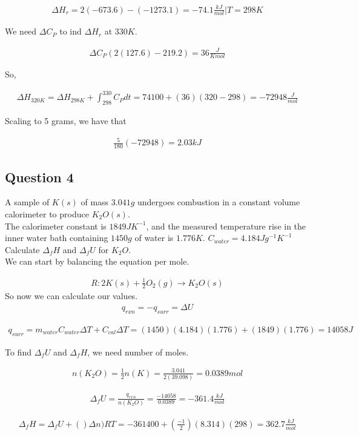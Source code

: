 \documentclass[12pt]{book}
\begin{document}
\begin{align*}
    \Delta H_r=2(-673.6)-(-1273.1)=-74.1\frac{kJ}{mol}|T=298K
\end{align*}

We need $\Delta C_P$ to ind $\Delta H_r$ at $330K$.

\begin{align*}
    \Delta C_P(2(127.6)-219.2)=36\frac{J}{Kmol}
\end{align*}

So,

\begin{align*}
    \Delta H_{320K}=\Delta H_{298K}+\int_{298}^{330}C_P dt=74100+(36)(320-298)=-72948\frac{J}{mol}
\end{align*}

Scaling to 5 grams, we have that

\begin{align*}
    \frac{5}{180}(-72948)=2.03kJ
\end{align*}

\subsection*{Question 4}
A sample of $K(s)$ of mass $3.041 g$ undergoes combustion in a constant volume calorimeter to
produce $K_2O(s)$.\\

The calorimeter constant is $1849 JK^{-1}$, and the measured temperature rise in the inner water
bath containing $1450 g$ of water is $1.776 K$. $C_{water} = 4.184 J g^{-1} K^{-1}$
Calculate $\Delta_f H$ and $\Delta_f U$ for $K_2O$.\\

We can start by balancing the equation per mole.

\begin{align*}
    R: 2K(s)+\frac{1}{2}O_2(g)\rightarrow K_2O(s)
\end{align*}
So now we can calculate our values.
\begin{align*}
    q_{rxn}=-q_{surr}=\Delta U
\end{align*}

\begin{align*}
    q_{surr}=m_{water}C_{water}\Delta T+C_{cal} \Delta T=(1450)(4.184)(1.776)+(1849)(1.776)=14058J
\end{align*}

To find $\Delta_f U$ and $\Delta_f H$, we need number of moles.

\begin{align*}
    n(K_2O)=\frac{1}{2}n(K)=\frac{3.041}{2(39.098)}=0.0389 mol
\end{align*}

\begin{align*}
    \Delta_f U=\frac{q_{rxn}}{n(K_2O)}=\frac{-14058}{0.0389}=-361.4\frac{kJ}{mol}
\end{align*}

\begin{align*}
    \Delta_f H=\Delta_f U+()\Delta n) RT=-361400+\left(\frac{-1}{2}\right)(8.314)(298)=362.7 \frac{kJ}{mol}
\end{align*}
\end{document}
